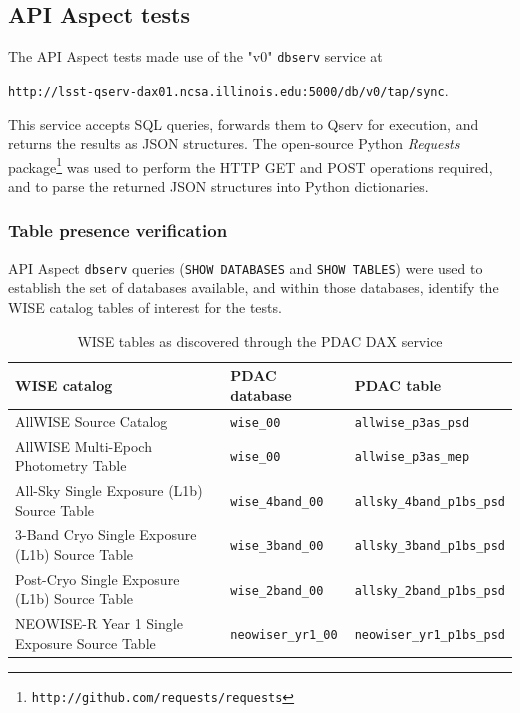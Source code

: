 \documentclass[DM,lsstdraft,STR,toc]{lsstdoc}
\begin{document}
\subsection{API Aspect tests}

The API Aspect tests made use of the "v0" \texttt{dbserv} service at 

\begin{center}
\texttt{http://lsst-qserv-dax01.ncsa.illinois.edu:5000/db/v0/tap/sync}.
\end{center}

This service accepts SQL queries, forwards them to Qserv for execution, and returns the results as JSON structures.
The open-source Python \emph{Requests} package\footnote{\texttt{http://github.com/requests/requests}} was used to perform the HTTP GET and POST operations required, and to parse the returned JSON structures into Python dictionaries.

\subsubsection{Table presence verification}
\label{sect:lsp-00-00-api-tables}

API Aspect \verb|dbserv| queries (\texttt{SHOW DATABASES} and \texttt{SHOW TABLES}) were used to establish the set of databases available, and within those databases, identify the WISE catalog tables of interest for the tests.

\begin{table}[h]
\centering
\begin{tabular}{p{} l l}
WISE catalog & PDAC database & PDAC table \\ \hline
AllWISE Source Catalog & \verb|wise_00| & \verb|allwise_p3as_psd| \\
AllWISE Multi-Epoch Photometry Table & \verb|wise_00| & \verb|allwise_p3as_mep| \\
All-Sky Single Exposure (L1b) Source Table & \verb|wise_4band_00| & \verb|allsky_4band_p1bs_psd| \\
3-Band Cryo Single Exposure (L1b) Source Table & \verb|wise_3band_00| & \verb|allsky_3band_p1bs_psd| \\
Post-Cryo Single Exposure (L1b) Source Table & \verb|wise_2band_00| & \verb|allsky_2band_p1bs_psd| \\
NEOWISE-R Year 1 Single Exposure Source Table & \verb|neowiser_yr1_00| & \verb|neowiser_yr1_p1bs_psd| \\
\end{tabular}
\caption{WISE tables as discovered through the PDAC DAX service}
\label{tab:wisetables}
\end{table}
\end{document}
